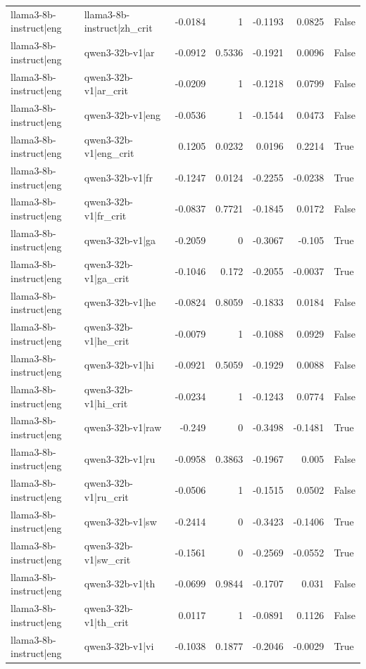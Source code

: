 \begin{table}
\begin{tabular}{l l r r r r l}
llama3-8b-instruct|eng & llama3-8b-instruct|zh_crit & -0.0184 & 1 & -0.1193 & 0.0825 & False \\
llama3-8b-instruct|eng & qwen3-32b-v1|ar & -0.0912 & 0.5336 & -0.1921 & 0.0096 & False \\
llama3-8b-instruct|eng & qwen3-32b-v1|ar_crit & -0.0209 & 1 & -0.1218 & 0.0799 & False \\
llama3-8b-instruct|eng & qwen3-32b-v1|eng & -0.0536 & 1 & -0.1544 & 0.0473 & False \\
llama3-8b-instruct|eng & qwen3-32b-v1|eng_crit & 0.1205 & 0.0232 & 0.0196 & 0.2214 & True \\
llama3-8b-instruct|eng & qwen3-32b-v1|fr & -0.1247 & 0.0124 & -0.2255 & -0.0238 & True \\
llama3-8b-instruct|eng & qwen3-32b-v1|fr_crit & -0.0837 & 0.7721 & -0.1845 & 0.0172 & False \\
llama3-8b-instruct|eng & qwen3-32b-v1|ga & -0.2059 & 0 & -0.3067 & -0.105 & True \\
llama3-8b-instruct|eng & qwen3-32b-v1|ga_crit & -0.1046 & 0.172 & -0.2055 & -0.0037 & True \\
llama3-8b-instruct|eng & qwen3-32b-v1|he & -0.0824 & 0.8059 & -0.1833 & 0.0184 & False \\
llama3-8b-instruct|eng & qwen3-32b-v1|he_crit & -0.0079 & 1 & -0.1088 & 0.0929 & False \\
llama3-8b-instruct|eng & qwen3-32b-v1|hi & -0.0921 & 0.5059 & -0.1929 & 0.0088 & False \\
llama3-8b-instruct|eng & qwen3-32b-v1|hi_crit & -0.0234 & 1 & -0.1243 & 0.0774 & False \\
llama3-8b-instruct|eng & qwen3-32b-v1|raw & -0.249 & 0 & -0.3498 & -0.1481 & True \\
llama3-8b-instruct|eng & qwen3-32b-v1|ru & -0.0958 & 0.3863 & -0.1967 & 0.005 & False \\
llama3-8b-instruct|eng & qwen3-32b-v1|ru_crit & -0.0506 & 1 & -0.1515 & 0.0502 & False \\
llama3-8b-instruct|eng & qwen3-32b-v1|sw & -0.2414 & 0 & -0.3423 & -0.1406 & True \\
llama3-8b-instruct|eng & qwen3-32b-v1|sw_crit & -0.1561 & 0 & -0.2569 & -0.0552 & True \\
llama3-8b-instruct|eng & qwen3-32b-v1|th & -0.0699 & 0.9844 & -0.1707 & 0.031 & False \\
llama3-8b-instruct|eng & qwen3-32b-v1|th_crit & 0.0117 & 1 & -0.0891 & 0.1126 & False \\
llama3-8b-instruct|eng & qwen3-32b-v1|vi & -0.1038 & 0.1877 & -0.2046 & -0.0029 & True \\

\end{tabular}
\end{table}
